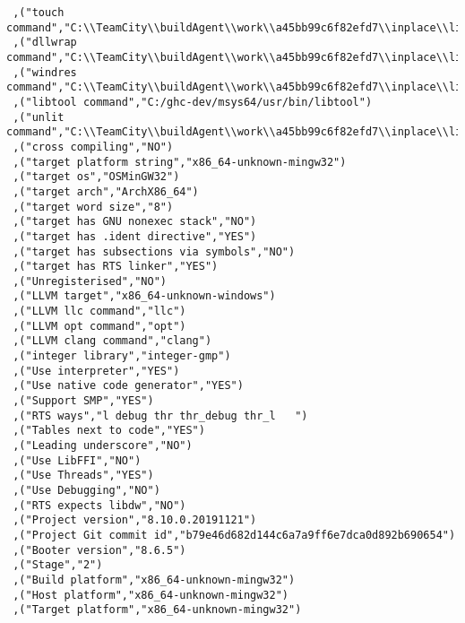 \begin{verbatim}
 ,("touch command","C:\\TeamCity\\buildAgent\\work\\a45bb99c6f82efd7\\inplace\\lib/bin/touchy.exe")
 ,("dllwrap command","C:\\TeamCity\\buildAgent\\work\\a45bb99c6f82efd7\\inplace\\lib\\../mingw/bin/dllwrap.exe")
 ,("windres command","C:\\TeamCity\\buildAgent\\work\\a45bb99c6f82efd7\\inplace\\lib\\../mingw/bin/windres.exe")
 ,("libtool command","C:/ghc-dev/msys64/usr/bin/libtool")
 ,("unlit command","C:\\TeamCity\\buildAgent\\work\\a45bb99c6f82efd7\\inplace\\lib/bin/unlit.exe")
 ,("cross compiling","NO")
 ,("target platform string","x86_64-unknown-mingw32")
 ,("target os","OSMinGW32")
 ,("target arch","ArchX86_64")
 ,("target word size","8")
 ,("target has GNU nonexec stack","NO")
 ,("target has .ident directive","YES")
 ,("target has subsections via symbols","NO")
 ,("target has RTS linker","YES")
 ,("Unregisterised","NO")
 ,("LLVM target","x86_64-unknown-windows")
 ,("LLVM llc command","llc")
 ,("LLVM opt command","opt")
 ,("LLVM clang command","clang")
 ,("integer library","integer-gmp")
 ,("Use interpreter","YES")
 ,("Use native code generator","YES")
 ,("Support SMP","YES")
 ,("RTS ways","l debug thr thr_debug thr_l   ")
 ,("Tables next to code","YES")
 ,("Leading underscore","NO")
 ,("Use LibFFI","NO")
 ,("Use Threads","YES")
 ,("Use Debugging","NO")
 ,("RTS expects libdw","NO")
 ,("Project version","8.10.0.20191121")
 ,("Project Git commit id","b79e46d682d144c6a7a9ff6e7dca0d892b690654")
 ,("Booter version","8.6.5")
 ,("Stage","2")
 ,("Build platform","x86_64-unknown-mingw32")
 ,("Host platform","x86_64-unknown-mingw32")
 ,("Target platform","x86_64-unknown-mingw32")

\end{verbatim}
